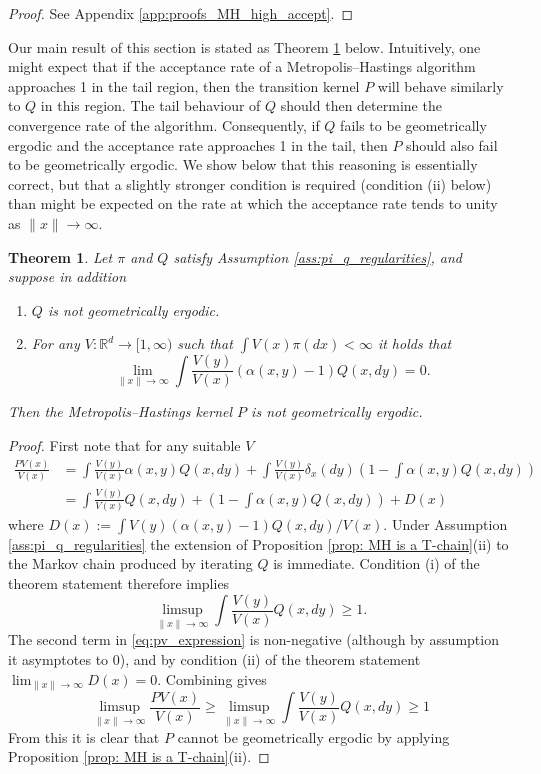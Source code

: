 \documentclass{article}
\theoremstyle{definition}
\theoremstyle{plain}
\newtheorem{theorem}[definition]{Theorem}
\begin{document}
\begin{proof}
See Appendix \ref{app:proofs_MH_high_accept}.
\end{proof}

Our main result of this section is stated as Theorem \ref{them:non-geometric-ergodicity} below.  Intuitively, one might expect that if the acceptance rate of a Metropolis--Hastings algorithm approaches 1 in the tail region, then the transition kernel $P$ will behave similarly to $Q$ in this region. The tail behaviour of $Q$ should then determine the convergence rate of the algorithm. Consequently, if $Q$ fails to be geometrically ergodic and the acceptance rate approaches 1 in the tail, then $P$ should also fail to be geometrically ergodic.  We show below that this reasoning is essentially correct, but that a slightly stronger condition is required (condition (ii) below) than might be expected on the rate at which the acceptance rate tends to unity as $\|x\|\to \infty$.

\begin{theorem}
\label{them:non-geometric-ergodicity}
Let $\pi$ and $Q$ satisfy Assumption \ref{ass:pi_q_regularities}, and suppose in addition
\begin{enumerate}
    \item[(i)] $Q$ is not geometrically ergodic.
    \item[(ii)] For any $V : \mathbb{R}^d \to [1,\infty)$ such that $\int V(x)\pi(dx) < \infty$ it holds that 
    \[
    \lim_{\|x\|\to\infty} \int \frac{V(y)}{V(x)}(\alpha(x,y) - 1) Q(x,dy) = 0.
    \]
\end{enumerate}
Then the Metropolis--Hastings kernel $P$ is not geometrically ergodic.
\end{theorem}

\begin{proof}
First note that for any suitable $V$
\begin{align}
\label{eq:pv_expression}
    \frac{PV(x)}{V(x)}
    &= \int \frac{V(y)}{V(x)} \alpha(x,y)Q(x,dy) + \int \frac{V(y)}{V(x)} \delta_x(dy)\left(1- \int\alpha(x,y) Q(x,dy)\right)\nonumber\\
    &= \int \frac{V(y)}{V(x)} Q(x,dy) +\left(1- \int\alpha(x,y) Q(x,dy)\right)+D(x)
\end{align}
where $D(x) := \int V(y)(\alpha(x,y)-1)Q(x,dy)/V(x)$.  Under Assumption \ref{ass:pi_q_regularities} the extension of Proposition \ref{prop: MH is a T-chain}(ii) to the Markov chain produced by iterating $Q$ is immediate.   Condition (i) of the theorem statement therefore implies
\[
\limsup_{\|x\|\to\infty}\int \frac{V(y)}{V(x)}Q(x,dy) \geq 1.
\]
The second term in \eqref{eq:pv_expression} is non-negative (although by assumption it asymptotes to 0), and by condition (ii) of the theorem statement $\lim_{\|x\|\to\infty}D(x) = 0$. Combining gives
\begin{equation}
    \limsup_{\|x\|\to\infty}\frac{PV(x)}{V(x)} \geq \limsup_{\|x\|\to\infty}\int\frac{V(y)}{V(x)}Q(x,dy) \geq 1
\end{equation}
From this it is clear that $P$ cannot be geometrically ergodic by applying Proposition \ref{prop: MH is a T-chain}(ii).
\end{proof}
\end{document}
